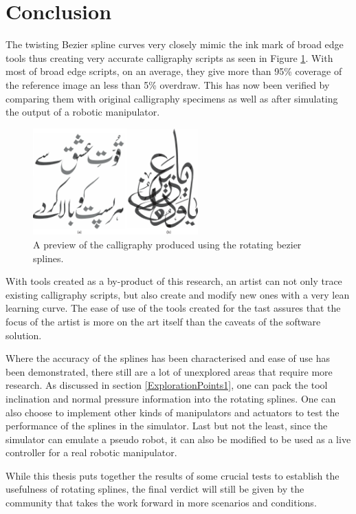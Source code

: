 \section{Conclusion}
\label{Chapter:Conclusion}
{
    The twisting Bezier spline curves very closely mimic the ink mark of broad edge tools thus creating very accurate calligraphy scripts as seen in Figure \ref{Image:spline_prev}. With most of broad edge scripts, on an average, they give more than 95\% coverage of the reference image an less than 5\% overdraw. This has now been verified by comparing them with original calligraphy specimens as well as after simulating the output of a robotic manipulator.

    \begin{figure}[!t]
        \centering
        \includegraphics[width=2.5in]{../Images/rotating bezier splines preview.pdf}
      \caption{A preview of the calligraphy produced using the rotating bezier splines.
      } \label{Image:spline_prev}
    \end{figure}

    With tools created as a by-product of this research, an artist can not only trace existing calligraphy scripts, but also create and modify new ones with a very lean learning curve. The ease of use of the tools created for the tast assures that the focus of the artist is more on the art itself than the caveats of the software solution.

    Where the accuracy of the splines has been characterised and ease of use has been demonstrated, there still are a lot of unexplored areas that require more research. As discussed in section \ref{ExplorationPoints1}, one can pack the tool inclination and normal pressure information into the rotating splines. One can also choose to implement other kinds of manipulators and actuators to test the performance of the splines in the simulator. Last but not the least, since the simulator can emulate a pseudo robot, it can also be modified to be used as a live controller for a real robotic manipulator.

    While this thesis puts together the results of some crucial tests to establish the usefulness of rotating splines, the final verdict will still be given by the community that takes the work forward in more scenarios and conditions.
}